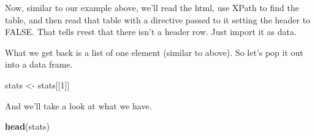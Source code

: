 \documentclass[]{book}
\newenvironment{Shaded}{\begin{snugshade}}{\end{snugshade}}
\newcommand{\DataTypeTok}[1]{\textcolor[rgb]{0.13,0.29,0.53}{#1}}
\newcommand{\DecValTok}[1]{\textcolor[rgb]{0.00,0.00,0.81}{#1}}
\newcommand{\KeywordTok}[1]{\textcolor[rgb]{0.13,0.29,0.53}{\textbf{#1}}}
\newcommand{\NormalTok}[1]{#1}
\newcommand{\OperatorTok}[1]{\textcolor[rgb]{0.81,0.36,0.00}{\textbf{#1}}}
\newcommand{\OtherTok}[1]{\textcolor[rgb]{0.56,0.35,0.01}{#1}}
\newcommand{\StringTok}[1]{\textcolor[rgb]{0.31,0.60,0.02}{#1}}
\begin{document}
Now, similar to our example above, we'll read the html, use XPath to find the table, and then read that table with a directive passed to it setting the header to FALSE. That tells rvest that there isn't a header row. Just import it as data.

\begin{Shaded}
\end{Shaded}

What we get back is a list of one element (similar to above). So let's pop it out into a data frame.

\begin{Shaded}
\begin{Highlighting}[]
\NormalTok{stats <-}\StringTok{ }\NormalTok{stats[[}\DecValTok{1}\NormalTok{]]}
\end{Highlighting}
\end{Shaded}

And we'll take a look at what we have.

\begin{Shaded}
\begin{Highlighting}[]
\KeywordTok{head}\NormalTok{(stats)}
\end{Highlighting}
\end{Shaded}
\end{document}
